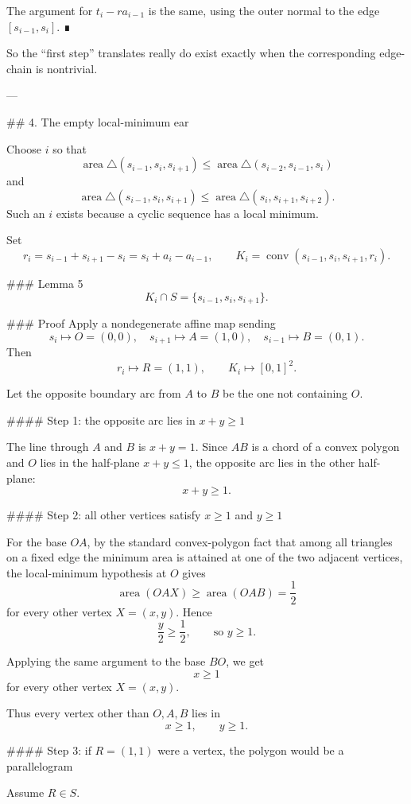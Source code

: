 The argument for \(t_i-r a_{i-1}\) is the same, using the outer normal to the edge \([s_{i-1},s_i]\). ∎

So the “first step” translates really do exist exactly when the corresponding edge-chain is nontrivial.

---

## 4. The empty local-minimum ear

Choose \(i\) so that
\[
\operatorname{area}\triangle(s_{i-1},s_i,s_{i+1})
\le
\operatorname{area}\triangle(s_{i-2},s_{i-1},s_i)
\]
and
\[
\operatorname{area}\triangle(s_{i-1},s_i,s_{i+1})
\le
\operatorname{area}\triangle(s_i,s_{i+1},s_{i+2}).
\]
Such an \(i\) exists because a cyclic sequence has a local minimum.

Set
\[
r_i=s_{i-1}+s_{i+1}-s_i=s_i+a_i-a_{i-1},
\qquad
K_i=\operatorname{conv}(s_{i-1},s_i,s_{i+1},r_i).
\]

### Lemma 5
\[
K_i\cap S=\{s_{i-1},s_i,s_{i+1}\}.
\]

### Proof
Apply a nondegenerate affine map sending
\[
s_i\mapsto O=(0,0),\quad
s_{i+1}\mapsto A=(1,0),\quad
s_{i-1}\mapsto B=(0,1).
\]
Then
\[
r_i\mapsto R=(1,1),\qquad K_i\mapsto [0,1]^2.
\]

Let the opposite boundary arc from \(A\) to \(B\) be the one not containing \(O\).

#### Step 1: the opposite arc lies in \(x+y\ge1\)

The line through \(A\) and \(B\) is \(x+y=1\). Since \(AB\) is a chord of a convex polygon and \(O\) lies in the half-plane \(x+y\le1\), the opposite arc lies in the other half-plane:
\[
x+y\ge1.
\]

#### Step 2: all other vertices satisfy \(x\ge1\) and \(y\ge1\)

For the base \(OA\), by the standard convex-polygon fact that among all triangles on a fixed edge the minimum area is attained at one of the two adjacent vertices, the local-minimum hypothesis at \(O\) gives
\[
\operatorname{area}(OAX)\ge \operatorname{area}(OAB)=\frac12
\]
for every other vertex \(X=(x,y)\). Hence
\[
\frac{y}{2}\ge\frac12,\qquad\text{so } y\ge1.
\]

Applying the same argument to the base \(BO\), we get
\[
x\ge1
\]
for every other vertex \(X=(x,y)\).

Thus every vertex other than \(O,A,B\) lies in
\[
x\ge1,\qquad y\ge1.
\]

#### Step 3: if \(R=(1,1)\) were a vertex, the polygon would be a parallelogram

Assume \(R\in S\).

